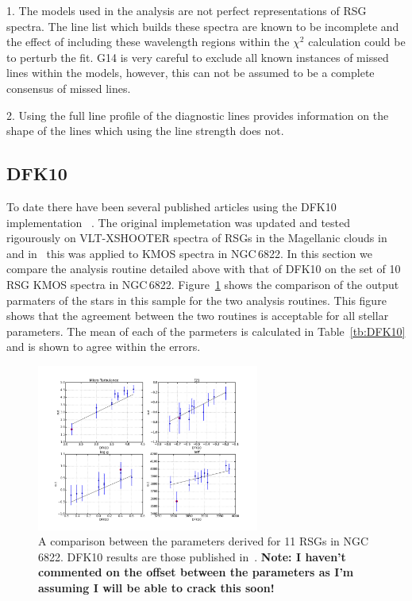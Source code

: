 1. The models used in the analysis are not perfect representations of RSG spectra.
The line list which builds these spectra are known to be incomplete and the effect of including these wavelength regions within the $\chi^{2}$ calculation could be to perturb the fit. G14 is very careful to exclude all known instances of missed lines within the models, however, this can not be assumed to be a complete consensus of missed lines.

2. Using the full line profile of the diagnostic lines provides information on the shape of the lines which using the line strength does not.

\subsection{DFK10} %
\label{sub:dfk10}
To date there have been several published articles using the DFK10 implementation
~\citep{2010MNRAS.407.1203D,2015ApJ...803...14P,2015ApJ...806...21D}.
The original implemetation was updated and tested rigourously on VLT-XSHOOTER spectra of RSGs in the Magellanic clouds in
~\cite{2015ApJ...806...21D} and in~\cite{2015ApJ...803...14P} this was applied to KMOS spectra in NGC\,6822.
In this section we compare the analysis routine detailed above with that of DFK10 on the set of 10 RSG KMOS spectra in NGC\,6822.
Figure~\ref{fig:n6822DFK} shows the comparison of the output parmaters of the stars in this sample for the two analysis routines.
This figure shows that the agreement between the two routines is acceptable for all stellar parameters.
The mean of each of the parmeters is calculated in Table~\ref{tb:DFK10} and is shown to agree within the errors.

\begin{figure}
 \centering
 \includegraphics[width=0.65\textwidth]{JAnal/compare-DFK10}
 \caption[NGC\,6822 DFK10]{
A comparison between the parameters derived for 11 RSGs in NGC\,6822.
DFK10 results are those published in~\cite{2015ApJ...803...14P}.
\textbf{Note: I haven't commented on the offset between the parameters as I'm assuming I will be able to crack this soon!}\label{fig:n6822DFK}
         }
\end{figure}

